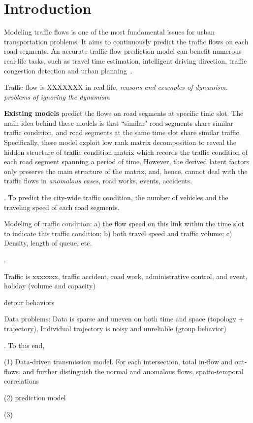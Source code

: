 \section{Introduction}
\label{sec-intro}

Modeling traffic flows is one of the most fundamental issues for urban transportation problems. It aims to continuously predict the traffic flows on each road segments. An accurate traffic flow prediction model can benefit numerous real-life tasks, such as travel time estimation, intelligent driving direction, traffic congestion detection and urban planning~\cite{Zheng2014TIST}.

Traffic flow is XXXXXXX in real-life. {\em reasons and examples of dynamism.} {\em problems of ignoring the dynamism}

{\bf Existing models} predict the flows on road segments at specific time slot. The main idea behind these models is that ``similar" road segments share similar traffic condition, and road segments at the same time slot share similar traffic. Specifically, these model exploit low rank matrix decomposition to reveal the hidden structure of traffic condition matrix which records the traffic condition of each road segment spanning a period of time. However, the derived latent factors only preserve the main structure of the matrix, and, hence, cannot deal with the traffic flows in {\em anomalous cases}, \eg road works, events, accidents.

. To predict the city-wide traffic condition, \ie the number of vehicles and the traveling speed of each road segments.

Modeling of traffic condition:
a)	the flow speed on this link within the time slot to indicate this traffic condition;
b)	both travel speed and traffic volume;
c)	Density, length of queue, etc.

.
\bi
\item Traffic is xxxxxxx, \eg traffic accident, road work, administrative control, and event, holiday (volume and capacity)
\item detour behaviors
\item Data problems: Data is sparse and uneven on both time and space (topology + trajectory), Individual trajectory is noisy and unreliable (group behavior)
\ei

. To this end,

\ni (1) Data-driven transmission model. For each intersection, total in-flow and out-flows, and further distinguish the normal and anomalous flows, spatio-temporal correlations

\ni (2) prediction model

\ni (3)

